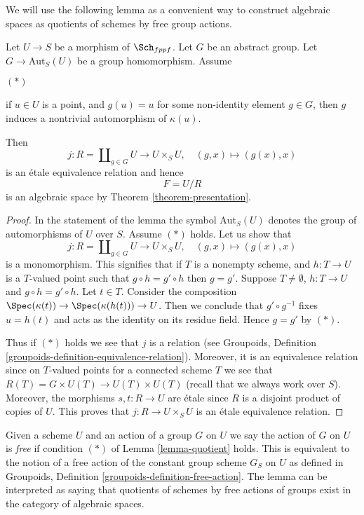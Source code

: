 \medskip\noindent
We will use the following lemma as a convenient way to construct
algebraic spaces as quotients of schemes by free group actions.

\begin{lemma}
\label{lemma-quotient}
Let $U \to S$ be a morphism of $\Sch_{fppf}$.
Let $G$ be an abstract group. Let $G \to \text{Aut}_S(U)$
be a group homomorphism. Assume
\begin{list}{$(*)$}{}
\item if $u \in U$ is a point, and $g(u) = u$
for some non-identity element $g \in G$, then $g$
induces a nontrivial automorphism of $\kappa(u)$.
\end{list}
Then
$$
j :
R = \coprod\nolimits_{g \in G} U
\longrightarrow
U \times_S U,
\quad
(g, x) \longmapsto (g(x), x)
$$
is an \'etale equivalence relation and hence
$$
F = U/R
$$
is an algebraic space by Theorem \ref{theorem-presentation}.
\end{lemma}

\begin{proof}
In the statement of the lemma the symbol $\text{Aut}_S(U)$ denotes
the group of automorphisms of $U$ over $S$.
Assume $(*)$ holds. Let us show that
$$
j :
R = \coprod\nolimits_{g \in G} U
\longrightarrow
U \times_S U,
\quad
(g, x) \longmapsto (g(x), x)
$$
is a monomorphism. This signifies that if $T$ is a nonempty
scheme, and $h : T \to U$ is a $T$-valued point such that
$g \circ h = g' \circ h$ then $g = g'$. Suppose
$T \not = \emptyset$, $h : T \to U$ and $g \circ h = g' \circ h$.
Let $t \in T$. Consider the composition
$\Spec(\kappa(t)) \to \Spec(\kappa(h(t))) \to U$.
Then we conclude that $g' \circ g^{-1}$ fixes $u = h(t)$ and
acts as the identity on its residue field. Hence $g = g'$ by $(*)$.

\medskip\noindent
Thus if $(*)$ holds we see that $j$ is a relation (see
Groupoids, Definition \ref{groupoids-definition-equivalence-relation}).
Moreover, it is an equivalence relation since on $T$-valued points
for a connected scheme $T$ we see that
$R(T) = G \times U(T) \to U(T) \times U(T)$ (recall that we always
work over $S$). Moreover, the morphisms $s, t : R \to U$ are \'etale
since $R$ is a disjoint product of copies of $U$.
This proves that $j : R \to U \times_S U$ is an \'etale equivalence relation.
\end{proof}

\noindent
Given a scheme $U$ and an action of a group $G$ on $U$ we say the action
of $G$ on $U$ is {\it free} if condition $(*)$ of Lemma \ref{lemma-quotient}
holds. This is equivalent to the notion of a free action of the constant
group scheme $G_S$ on $U$ as defined in
Groupoids, Definition \ref{groupoids-definition-free-action}.
The lemma can be interpreted as saying that quotients of schemes by
free actions of groups exist in the category of algebraic spaces.

